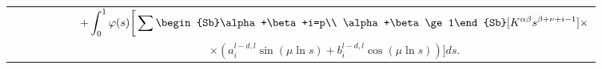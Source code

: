 \begin{center}
\begin{tabular}{|c|c|c|c|c|}
\ & \ & \ & \ & 


$\displaystyle+\int^1_0\varphi(s)\bigg[\sum\begin{Sb}\alpha+\beta+i=p\\ 


\alpha+\beta\ge1\end{Sb}[K^{\alpha\beta}s^{\beta+\nu+i-1}]\times$ \\


\ & \ & \ & \ & 


$\times(a_i^{l-d,l}\sin(\mu\ln s)+b_i^{l-d,l}\cos(\mu\ln s))\bigg]ds$. \\





\hline


\end{tabular}


\end{center}














